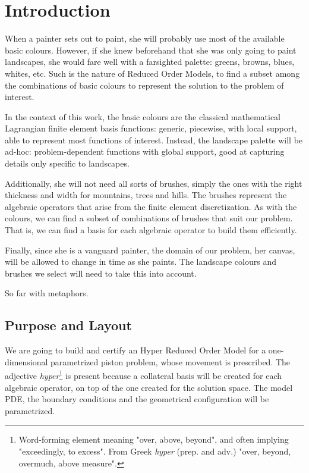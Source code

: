 \documentclass[thesis.tex]{subfiles}
\begin{document}
\section{Introduction}
When a painter sets out to paint, she will probably use most of the available basic colours.
However, if she knew beforehand that she was only going to paint landscapes, 
she would fare well with a farsighted palette: greens, browns, blues, whites, etc.
Such is the nature of Reduced Order Models, 
to find a subset among the combinations of basic colours 
to represent the solution to the problem of interest.

In the context of this work, 
the basic colours are the classical mathematical Lagrangian finite element basis functions: 
generic, piecewise, with local support, able to represent most functions of interest.
Instead, the landscape palette will be ad-hoc:
problem-dependent functions with global support, 
good at capturing details only specific to landscapes.

Additionally, she will not need all sorts of brushes, 
simply the ones with the right thickness and width for mountains, trees and hills.
The brushes represent the algebraic operators that arise from the finite element discretization.
As with the colours, we can find a subset of combinations of brushes that suit our problem.
That is, we can find a basis for each algebraic operator to build them efficiently.

Finally, since she is a vanguard painter, the domain of our problem, her canvas, 
will be allowed to change in time as she paints.
The landscape colours and brushes we select will need to take this into account.

So far with metaphors.

\subsection{Purpose and Layout}
We are going to build and certify an
{Hyper Reduced Order Model} 
for a one-dimensional parametrized piston problem, 
whose movement is prescribed.
The adjective \mbox{\textit{hyper}}\footnote{
    Word-forming element meaning "over, above, beyond", 
    and often implying "exceedingly, to excess".
    From Greek \textit{hyper} (prep. and adv.) 
    "over, beyond, overmuch, above measure".
} is present because 
a collateral basis will be created for each algebraic operator,
on top of the one created for the solution space.
The model PDE, the boundary conditions and the geometrical configuration will be parametrized.
\end{document}
